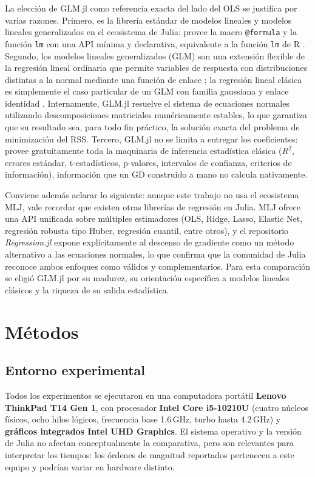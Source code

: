 \documentclass[11pt,a4paper]{article}
\begin{document}
La elección de GLM.jl como referencia exacta del lado del OLS se justifica por varias razones. Primero, es la librería estándar de modelos lineales y modelos lineales generalizados en el ecosistema de Julia: provee la macro \texttt{@formula} y la función \texttt{lm} con una API mínima y declarativa, equivalente a la función \texttt{lm} de R \cite{datacamp_lm}. Segundo, los modelos lineales generalizados (GLM) son una extensión flexible de la regresión lineal ordinaria que permite variables de respuesta con distribuciones distintas a la normal mediante una función de enlace \cite{wiki_glm,datacamp_glm}; la regresión lineal clásica es simplemente el caso particular de un GLM con familia gaussiana y enlace identidad \cite{numxl_glm}. Internamente, GLM.jl resuelve el sistema de ecuaciones normales utilizando descomposiciones matriciales numéricamente estables, lo que garantiza que su resultado sea, para todo fin práctico, la solución exacta del problema de minimización del RSS. Tercero, GLM.jl no se limita a entregar los coeficientes: provee gratuitamente toda la maquinaria de inferencia estadística clásica ($R^2$, errores estándar, t-estadísticos, p-valores, intervalos de confianza, criterios de información), información que un GD construido a mano no calcula nativamente.

Conviene además aclarar lo siguiente: aunque este trabajo no usa el ecosistema MLJ, vale recordar que existen otras librerías de regresión en Julia. MLJ ofrece una API unificada sobre múltiples estimadores (OLS, Ridge, Lasso, Elastic Net, regresión robusta tipo Huber, regresión cuantil, entre otros), y el repositorio \textit{Regression.jl} expone explícitamente al descenso de gradiente como un método alternativo a las ecuaciones normales, lo que confirma que la comunidad de Julia reconoce ambos enfoques como válidos y complementarios. Para esta comparación se eligió GLM.jl por su madurez, su orientación específica a modelos lineales clásicos y la riqueza de su salida estadística.

\section{Métodos}

\subsection{Entorno experimental}

Todos los experimentos se ejecutaron en una computadora portátil \textbf{Lenovo ThinkPad T14 Gen 1}, con procesador \textbf{Intel Core i5-10210U} (cuatro núcleos físicos, ocho hilos lógicos, frecuencia base 1.6\,GHz, turbo hasta 4.2\,GHz) y \textbf{gráficos integrados Intel UHD Graphics}. El sistema operativo y la versión de Julia no afectan conceptualmente la comparativa, pero son relevantes para interpretar los tiempos: los órdenes de magnitud reportados pertenecen a este equipo y podrían variar en hardware distinto.
\end{document}
